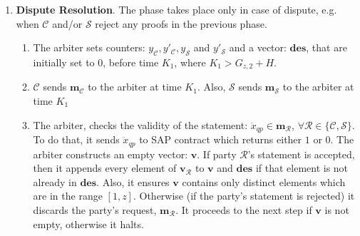 \begin{enumerate}
\begin{enumerate}

\end{enumerate}
\item \textbf{Dispute Resolution}\label{RCSP::Dispute-Resolution}. The phase takes place only in  case of dispute, e.g. when $\mathcal C$ and/or $\mathcal S$ reject any proofs in the previous phase. %

\begin{enumerate}


\item The arbiter sets  counters: $y_{\scriptscriptstyle\mathcal C}, y'_{\scriptscriptstyle\mathcal C},y_{\scriptscriptstyle\mathcal S}$ and  $y'_{\scriptscriptstyle\mathcal S}$ and a vector: $\bm{des}$, that are initially set to $0$,  before time $K_{\scriptscriptstyle 1}$,  where $K_{\scriptscriptstyle 1}>G_{\scriptscriptstyle z,2}+H$. 
\item $\mathcal C$  sends $\bm{m}_{\scriptscriptstyle\mathcal C}$ to the arbiter at time $K_{\scriptscriptstyle 1}$. Also,  $\mathcal S$ sends $\bm{m}_{\scriptscriptstyle\mathcal S}$ to the arbiter at time $K_{\scriptscriptstyle 1}$ %



\item\label{arbiter-checks-statement} The arbiter, checks the validity of the statement: $\ddot{x}_{\scriptscriptstyle qp}\in \bm{m}_{\scriptscriptstyle\mathcal R}$,  $\forall \mathcal R\in \{\mathcal {C,S}\}$. To do that, it sends  $\ddot{x}_{\scriptscriptstyle qp}$ to SAP contract which  returns  either $1$ or $0$. The arbiter  constructs an empty vector: $\bm{v}$.  If  party $\mathcal R$'s statement is accepted, then 
 it appends every  element of $\bm{v}_{\scriptscriptstyle\mathcal{R}}$ to $\bm{v}$ and $\bm{des}$  if that element is not already in $\bm{des}$. Also, it ensures $\bm{v}$ contains only distinct elements which are in the range $[1,z]$. Otherwise (if the party's statement is rejected) it discards the party's request, $\bm{m}_{\scriptscriptstyle\mathcal{R}}$. It proceeds to the next step if $\bm{v}$ is not empty, otherwise it halts. 


\end{enumerate}
\end{enumerate}
